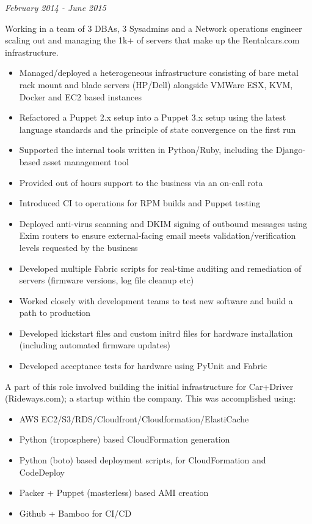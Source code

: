 \emph{February 2014 - June 2015}

Working in a team of 3 DBAs, 3 Sysadmins and a Network operations
engineer scaling out and managing the 1k+ of servers that make up the
Rentalcars.com infrastructure.

\begin{itemize}
\tightlist
\item
  Managed/deployed a heterogeneous infrastructure consisting of bare
  metal rack mount and blade servers (HP/Dell) alongside VMWare ESX,
  KVM, Docker and EC2 based instances
\item
  Refactored a Puppet 2.x setup into a Puppet 3.x setup using the latest
  language standards and the principle of state convergence on the first
  run
\item
  Supported the internal tools written in Python/Ruby, including the
  Django-based asset management tool
\item
  Provided out of hours support to the business via an on-call rota
\item
  Introduced CI to operations for RPM builds and Puppet testing
\item
  Deployed anti-virus scanning and DKIM signing of outbound messages
  using Exim routers to ensure external-facing email meets
  validation/verification levels requested by the business
\item
  Developed multiple Fabric scripts for real-time auditing and
  remediation of servers (firmware versions, log file cleanup etc)
\item
  Worked closely with development teams to test new software and build a
  path to production
\item
  Developed kickstart files and custom initrd files for hardware
  installation (including automated firmware updates)
\item
  Developed acceptance tests for hardware using PyUnit and Fabric
\end{itemize}

A part of this role involved building the initial infrastructure for
Car+Driver (Rideways.com); a startup within the company. This was
accomplished using:

\begin{itemize}
\tightlist
\item
  AWS EC2/S3/RDS/Cloudfront/Cloudformation/ElastiCache
\item
  Python (troposphere) based CloudFormation generation
\item
  Python (boto) based deployment scripts, for CloudFormation and
  CodeDeploy
\item
  Packer + Puppet (masterless) based AMI creation
\item
  Github + Bamboo for CI/CD
\end{itemize}

